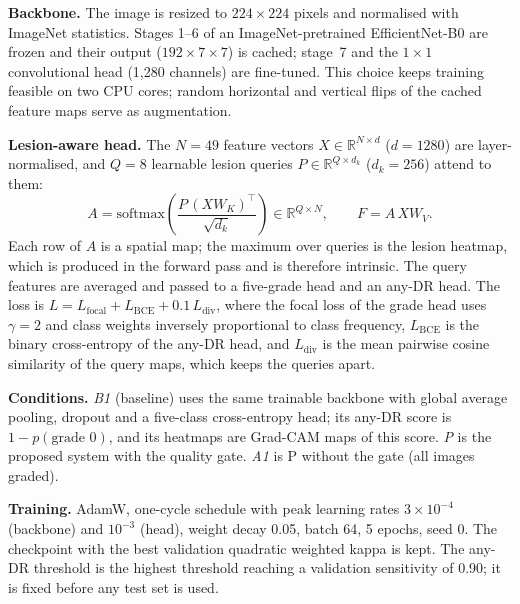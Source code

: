 \documentclass[11pt,a4paper]{article}
\begin{document}
\textbf{Backbone.} The image is resized to $224\times224$ pixels and normalised with ImageNet statistics. Stages 1--6 of an ImageNet-pretrained EfficientNet-B0 \cite{tan2019} are frozen and their output ($192\times7\times7$) is cached; stage~7 and the $1\times1$ convolutional head (1{,}280 channels) are fine-tuned. This choice keeps training feasible on two CPU cores; random horizontal and vertical flips of the cached feature maps serve as augmentation.

\textbf{Lesion-aware head.} The $N=49$ feature vectors $X\in\mathbb{R}^{N\times d}$ ($d=1280$) are layer-normalised, and $Q=8$ learnable lesion queries $P\in\mathbb{R}^{Q\times d_k}$ ($d_k=256$) attend to them:
\begin{equation}
A=\mathrm{softmax}\!\left(\frac{P\,(XW_K)^{\top}}{\sqrt{d_k}}\right)\in\mathbb{R}^{Q\times N},\qquad F=A\,XW_V .
\end{equation}
Each row of $A$ is a spatial map; the maximum over queries is the lesion heatmap, which is produced in the forward pass and is therefore intrinsic. The query features are averaged and passed to a five-grade head and an any-DR head. The loss is $L=L_{\mathrm{focal}}+L_{\mathrm{BCE}}+0.1\,L_{\mathrm{div}}$, where the focal loss \cite{lin2020} of the grade head uses $\gamma=2$ and class weights inversely proportional to class frequency, $L_{\mathrm{BCE}}$ is the binary cross-entropy of the any-DR head, and $L_{\mathrm{div}}$ is the mean pairwise cosine similarity of the query maps, which keeps the queries apart.

\textbf{Conditions.} \emph{B1} (baseline) uses the same trainable backbone with global average pooling, dropout and a five-class cross-entropy head; its any-DR score is $1-p(\text{grade }0)$, and its heatmaps are Grad-CAM maps \cite{selvaraju2020} of this score. \emph{P} is the proposed system with the quality gate. \emph{A1} is P without the gate (all images graded).

\textbf{Training.} AdamW, one-cycle schedule with peak learning rates $3\times10^{-4}$ (backbone) and $10^{-3}$ (head), weight decay 0.05, batch 64, 5 epochs, seed 0. The checkpoint with the best validation quadratic weighted kappa is kept. The any-DR threshold is the highest threshold reaching a validation sensitivity of 0.90; it is fixed before any test set is used.
\end{document}
